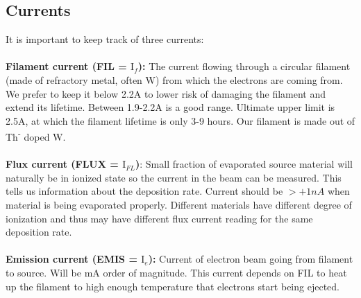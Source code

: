 \subsection{Currents}
It is important to keep track of three currents:\\\\
\textbf{Filament current (FIL = $\text{I}_f$):} The current flowing through a circular filament (made of refractory metal, often W) from which the electrons are coming from.  We prefer to keep it below 2.2A to lower risk of damaging the filament and extend its lifetime. Between 1.9-2.2A is a good range.  Ultimate upper limit is 2.5A, at which the filament lifetime is only 3-9 hours. Our filament is made out of Th\textsuperscript{-} doped W.\\\\
\textbf{Flux current (FLUX =  $\text{I}_{FL}$)}: Small fraction of evaporated source material will naturally be in ionized state so the current in the beam can be measured. This tells us information about the deposition rate. Current should be $>+1nA$ when material is being evaporated properly. Different materials have different degree of ionization and thus may have different flux current reading for the same deposition rate. \\\\
\textbf{Emission current (EMIS = $\text{I}_e$):} Current of electron beam going from filament to source. Will be mA order of magnitude. This current depends on FIL to heat up the filament to high enough temperature that electrons start being ejected.



